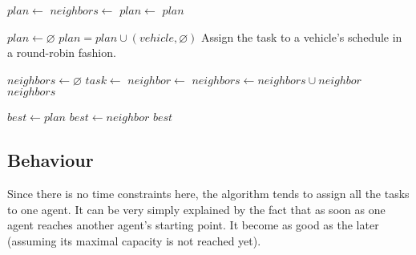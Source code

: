 \documentclass[11pt,a4paper]{article}
\begin{document}
\begin{algorithmic}
        \State $plan \gets $ 
            \State $neighbors \gets $ 
            \State $plan \gets $ 
        \EndWhile
        \State \Return $plan$
    \EndFunction

        \State $plan \gets \varnothing$
            \State $plan = plan \cup (vehicle, \varnothing)$
        \EndFor
            \State Assign the task to a vehicle's schedule in a round-robin fashion.
        \EndFor
    \EndFunction

        \State $neighbors \gets \varnothing$
        \State $task \gets $ 
                \State $neighbor \gets $ 
                \State {}
                \State {}
                \State $neighbors \gets neighbors \cup neighbor$
            \EndFor
        \EndFor
        \State \Return $neighbors$
    \EndFunction

        \State $best \gets plan$
                \State $best \gets neighbor$
            \EndIf
        \EndFor
        \State \Return $best$
    \EndFunction
\end{algorithmic}


\subsection*{Behaviour}

Since there is no time constraints here, the algorithm tends to assign all the
tasks to one agent. It can be very simply explained by the fact that as soon as
one agent reaches another agent's starting point. It become as good as the later (assuming its maximal capacity is not reached yet).
\end{document}
